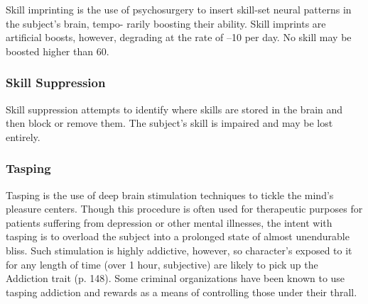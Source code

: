 Skill imprinting is the use of psychosurgery to insert 
skill-set neural patterns in the subject's brain, tempo-
rarily boosting their ability. Skill imprints are artificial 
boosts, however, degrading at the rate of –10 per day. 
No skill may be boosted higher than 60.

\subsubsection{Skill Suppression}

Skill suppression attempts to identify where skills are 
stored in the brain and then block or remove them. 
The subject's skill is impaired and may be lost entirely.

\subsubsection{Tasping}

Tasping is the use of deep brain stimulation techniques 
to tickle the mind's pleasure centers. Though this 
procedure is often used for therapeutic purposes for 
patients suffering from depression or other mental 
illnesses, the intent with tasping is to overload the 
subject into a prolonged state of almost unendurable 
bliss. Such stimulation is highly addictive, however, so 
character's exposed to it for any length of time (over 
1 hour, subjective) are likely to pick up the Addiction 
trait (p. 148). Some criminal organizations have been 
known to use tasping addiction and rewards as a 
means of controlling those under their thrall.

